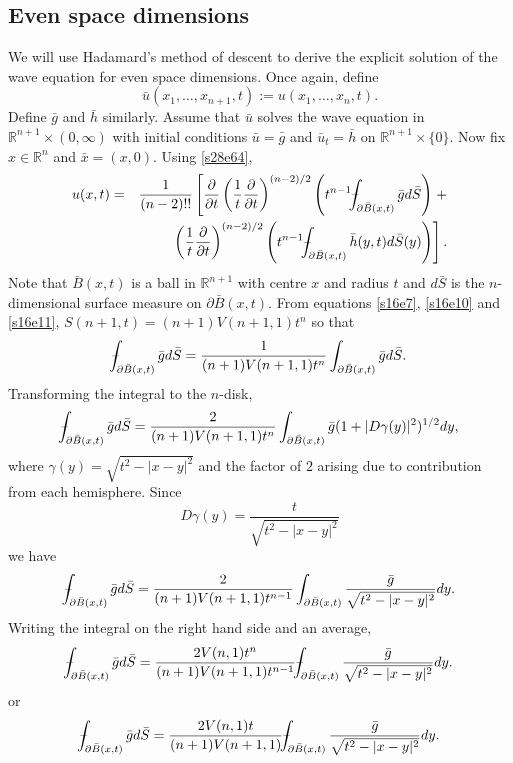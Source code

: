 \documentclass{article}
\newcommand{\fint}{\mbox{--}\mkern-16mu\int}
\theoremstyle{plain}
\numberwithin{thm}{section}
\theoremstyle{plain}
\numberwithin{prop}{section}
\theoremstyle{definition}
\numberwithin{defn}{section}
\theoremstyle{remark}
\numberwithin{equation}{section}
\begin{document}
\subsection{Even space dimensions}
We will use Hadamard's method of descent to derive the explicit solution of the wave equation for even space
dimensions. Once again, define 
\begin{equation}\label{s28e65}
\bar{u}(x_1, \ldots, x_{n+1}, t) := u(x_1, \ldots, x_n, t).
\end{equation}
Define $\bar{g}$ and $\bar{h}$ similarly. Assume that $\bar{u}$ solves the wave equation in $\mathbb{R}^{n+1}
\times (0, \infty)$ with initial conditions $\bar{u} = \bar{g}$ and $\bar{u}_t = \bar{h}$ on $\mathbb{R}^{n+1}
\times \{0\}$. Now fix $x \in \mathbb{R}^n$ and $\bar{x} = (x, 0)$. Using \eqref{s28e64},
\begin{eqnarray}
u(x,t) &=& \frac{1}{(n-2)!!}\left[\frac{\partial}{\partial t}\left(\frac{1}{t}\frac{\partial}{\partial t}
\right)^{(n-2)/2}\left(t^{n-1}\fint_{\partial\bar{B}(x,t)}\bar{g}d\bar{S}\right)\right. + \nonumber \\
& & \left.\left(\frac{1}{t}\frac{\partial}{\partial t}\right)^{(n-2)/2}\left(t^{n-1}
\fint_{\partial\bar{B}(x,t)}\bar{h}(y, t)d\bar{S}(y)\right)\right]. \label{s28e66}
\end{eqnarray}
Note that $\bar{B}(x,t)$ is a ball in $\mathbb{R}^{n+1}$ with centre $x$ and radius $t$ and $d\bar{S}$ is the
$n$-dimensional surface measure on $\partial\bar{B}(x,t)$. From equations \eqref{s16e7}, \eqref{s16e10} and
\eqref{s16e11}, $S(n+1, t) = (n+1)V(n+1,1)t^n$ so that
\[
\fint_{\partial\bar{B}(x,t)}\bar{g}d\bar{S} = \frac{1}{(n+1)V(n+1,1)t^n}\int_{\partial\bar{B}(x,t)}\bar{g}d\bar{S}.
\]
Transforming the integral to the $n$-disk,
\[
\fint_{\partial\bar{B}(x,t)}\bar{g}d\bar{S} = \frac{2}{(n+1)V(n+1,1)t^n}
\int_{\partial\bar{B}(x,t)}\bar{g}(1 + |D\gamma(y)|^2)^{1/2}dy,
\]
where $\gamma(y) = \sqrt{t^2 - |x - y|^2}$ and the factor of $2$ arising due to contribution from each hemisphere.
Since 
\[
D\gamma(y) = \frac{t}{\sqrt{t^2 - |x - y|^2}}
\]
we have
\[
\fint_{\partial\bar{B}(x,t)}\bar{g}d\bar{S} = \frac{2}{(n+1)V(n+1,1)t^{n-1}}
\int_{\partial\bar{B}(x,t)}\frac{\bar{g}}{\sqrt{t^2 - |x - y|^2}}dy.
\]
Writing the integral on the right hand side and an average,
\[
\fint_{\partial\bar{B}(x,t)}\bar{g}d\bar{S} = \frac{2V(n,1)t^n}{(n+1)V(n+1,1)t^{n-1}}
\fint_{\partial\bar{B}(x,t)}\frac{\bar{g}}{\sqrt{t^2 - |x - y|^2}}dy.
\]
or
\begin{equation}\label{s28e67}
\fint_{\partial\bar{B}(x,t)}\bar{g}d\bar{S} = \frac{2V(n,1)t}{(n+1)V(n+1,1)}
\fint_{\partial\bar{B}(x,t)}\frac{\bar{g}}{\sqrt{t^2 - |x - y|^2}}dy.
\end{equation}
\end{document}
